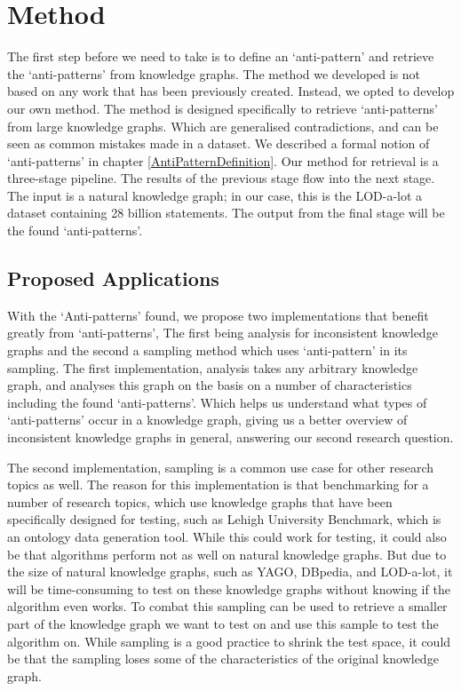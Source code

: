 \documentclass[11pt,letterpaper ,oneside ]{book}
\begin{document}
	\section{Method}
	The first step before we need to take is to define an `anti-pattern' and retrieve the `anti-patterns' from knowledge graphs. The method we developed is not based on any work that has been previously created. Instead, we opted to develop our own method. The method is designed specifically to retrieve `anti-patterns' from large knowledge graphs. Which are generalised contradictions, and can be seen as common mistakes made in a dataset. We described a formal notion of `anti-patterns' in chapter \ref{AntiPatternDefinition}. Our method for retrieval is a three-stage pipeline. The results of the previous stage flow into the next stage. The input is a natural knowledge graph; in our case, this is the LOD-a-lot\cite{JavierD:2017} a dataset containing 28 billion statements. The output from the final stage will be the found `anti-patterns'. 
	
	\subsection{Proposed Applications}
	With the `Anti-patterns' found, we propose two implementations that benefit greatly from `anti-patterns', The first being analysis for inconsistent knowledge graphs and the second a sampling method which uses `anti-pattern' in its sampling. The first implementation, analysis takes any arbitrary knowledge graph, and analyses this graph on the basis on a number of characteristics including the found `anti-patterns'. Which helps us understand what types of `anti-patterns' occur in a knowledge graph, giving us a better overview of inconsistent knowledge graphs in general, answering our second research question.
	
	The second implementation, sampling is a common use case for other research topics as well. The reason for this implementation is that benchmarking for a number of research topics, which use knowledge graphs that have been specifically designed for testing, such as Lehigh University Benchmark, which is an ontology data generation tool. While this could work for testing, it could also be that algorithms perform not as well on natural knowledge graphs. But due to the size of natural knowledge graphs, such as YAGO, DBpedia, and LOD-a-lot, it will be time-consuming to test on these knowledge graphs without knowing if the algorithm even works. To combat this sampling can be used to retrieve a smaller part of the knowledge graph we want to test on and use this sample to test the algorithm on. While sampling is a good practice to shrink the test space, it could be that the sampling loses some of the characteristics of the original knowledge graph. 
	
\end{document}
